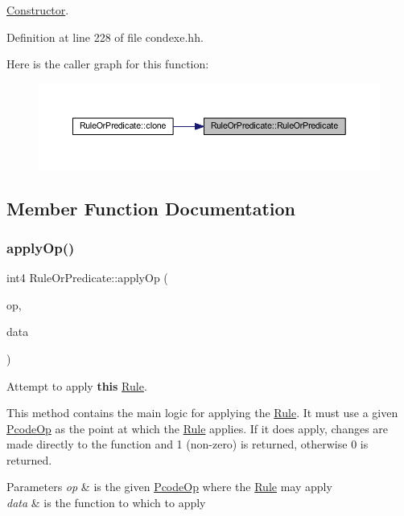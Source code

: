 \mbox{\hyperlink{class_constructor}{Constructor}}. 



Definition at line 228 of file condexe.\+hh.

Here is the caller graph for this function\+:
\nopagebreak
\begin{figure}[H]
\begin{center}
\leavevmode
\includegraphics[width=350pt]{class_rule_or_predicate_aafc3664581fdf2f48313e070addaad31_icgraph}
\end{center}
\end{figure}


\subsection{Member Function Documentation}
\mbox{\label{class_rule_or_predicate_ae9bd9f602cf43e10c02623d2ee5e6fc7}} 
\subsubsection{\texorpdfstring{applyOp()}{applyOp()}}
{\footnotesize\ttfamily int4 Rule\+Or\+Predicate\+::apply\+Op (\begin{DoxyParamCaption}\item[{\mbox{\hyperlink{class_pcode_op}{Pcode\+Op}} $\ast$}]{op,  }\item[{\mbox{\hyperlink{class_funcdata}{Funcdata}} \&}]{data }\end{DoxyParamCaption})\hspace{0.3cm}{\ttfamily [virtual]}}



Attempt to apply {\bfseries{this}} \mbox{\hyperlink{class_rule}{Rule}}. 

This method contains the main logic for applying the \mbox{\hyperlink{class_rule}{Rule}}. It must use a given \mbox{\hyperlink{class_pcode_op}{Pcode\+Op}} as the point at which the \mbox{\hyperlink{class_rule}{Rule}} applies. If it does apply, changes are made directly to the function and 1 (non-\/zero) is returned, otherwise 0 is returned. 
\begin{DoxyParams}{Parameters}
{\em op} & is the given \mbox{\hyperlink{class_pcode_op}{Pcode\+Op}} where the \mbox{\hyperlink{class_rule}{Rule}} may apply \\
\hline
{\em data} & is the function to which to apply \\
\hline
\end{DoxyParams}


